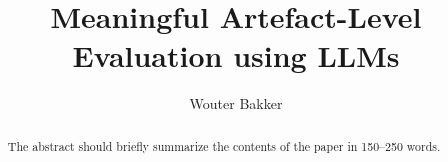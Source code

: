 \documentclass[runningheads]{llncs}
\begin{document}

\title{Meaningful Artefact-Level Evaluation using LLMs}
%
\author{Wouter Bakker}
%
\maketitle              %
%
\begin{abstract}
The abstract should briefly summarize the contents of the paper in
150--250 words.


\end{abstract}








% 
% 







\appendix







\end{document}
